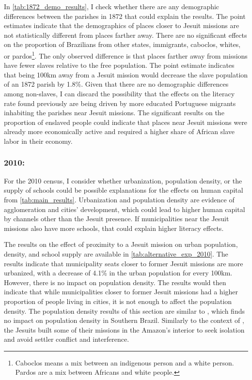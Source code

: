 \documentclass{article}
\begin{document}
In \autoref{tab:1872_demo_results}, I check whether there are any demographic differences between the parishes in 1872 that could explain the results. 
The point estimates indicate that the demographics of places closer to Jesuit missions are not statistically different from places farther away. 
There are no significant effects on the proportion of Brazilians from other states, immigrants, caboclos, whites, or pardos\footnote{
  Caboclos means a mix between an indigenous person and a white person. Pardos are a mix between Africans and white people.}. 
The only observed difference is that places farther away from missions have fewer slaves relative to the free population. The point estimate indicates that being 100km away from a Jesuit mission would decrease the slave population of an 1872 parish by 1.8\%. 
Given that there are no demographic differences among non-slaves, I can discard the possibility that the effects on the literacy rate found previously are being driven by more educated Portuguese migrants inhabiting the parishes near Jesuit missions. 
The significant results on the proportion of enslaved people could indicate that places near Jesuit missions were already more economically active and required a higher share of African slave labor in their economy.

\subsubsection{2010:}
For the 2010 census, I consider whether urbanization, population density, or the supply of schools could be possible explanations for the effects on human capital from \autoref{tab:main_results}. 
Urbanization and population density are evidence of agglomeration and cities' development, which could lead to higher human capital by channels other than the Jesuit presence. 
If municipalities near the Jesuit missions also have more schools, that could explain higher literacy effects.

The results on the effect of proximity to a Jesuit mission on urban population, density, and school supply are available in \autoref{tab:alternative_exp_2010}. 
The results indicate that municipality seats closer to former Jesuit missions are more urbanized, with a decrease of 4.1\% in the urban population for every 100km. However, there is no impact on population density. 
The results would then indicate that while municipalities closer to former Jesuit missions had a higher proportion of people living in cities, it is not enough to affect the population density. 
The population density results of this section are similar to \textcite{Valencia_Caicedo2018-gp}, which finds no impact on population density in Southern Brazil. 
Similarly to the context of \textcite{Valencia_Caicedo2018-gp}, the Jesuits built some of their missions in the Amazon's interior to seek isolation and avoid settler conflict and interference.
\end{document}
